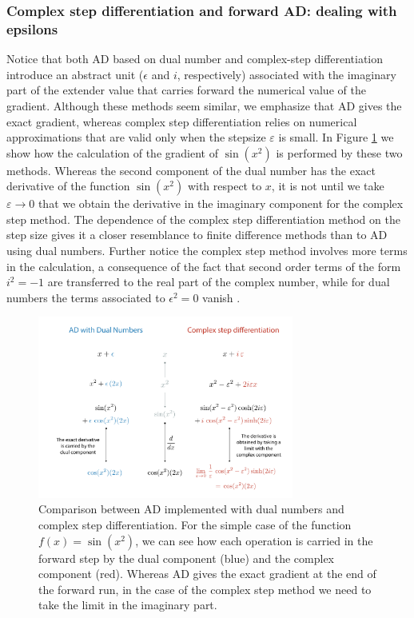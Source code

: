 \subsubsection{Complex step differentiation and forward AD: dealing with epsilons}

Notice that both AD based on dual number and complex-step differentiation introduce an abstract unit ($\epsilon$ and $i$, respectively) associated with the imaginary part of the extender value that carries forward the numerical value of the gradient.
Although these methods seem similar, we emphasize that AD gives the exact gradient, whereas complex step differentiation relies on numerical approximations that are valid only when the stepsize $\varepsilon$ is small. 
In Figure \ref{fig:complex-step-AD} we show how the calculation of the gradient of $\sin (x^2)$ is performed by these two methods.
Whereas the second component of the dual number has the exact derivative of the function $\sin(x^2)$ with respect to $x$, it is not until we take $\varepsilon \rightarrow 0$ that we obtain the derivative in the imaginary component for the complex step method.
The dependence of the complex step differentiation method on the step size gives it a closer resemblance to finite difference methods than to AD using dual numbers.
Further notice the complex step method involves more terms in the calculation, a consequence of the fact that second order terms of the form $i^2 = -1$ are transferred to the real part of the complex number, while for dual numbers the terms associated to $\epsilon^2 = 0$ vanish \cite{martins2001connection}. 
\begin{figure}[t]
    \centering
    \includegraphics[width=0.75\textwidth]{tex/figures/complex-step-AD.pdf}
    \caption{Comparison between AD implemented with dual numbers and complex step differentiation. For the simple case of the function $f(x) = \sin(x^2)$, we can see how each operation is carried in the forward step by the dual component (blue) and the complex component (red). Whereas AD gives the exact gradient at the end of the forward run, in the case of the complex step method we need to take the limit in the imaginary part. }
    \label{fig:complex-step-AD}
\end{figure}

